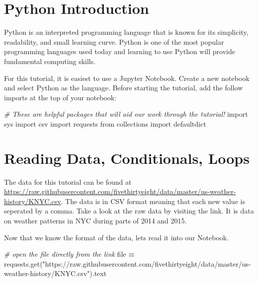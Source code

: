 \documentclass[]{book}
\newenvironment{Shaded}{\begin{snugshade}}{\end{snugshade}}
\newcommand{\StringTok}[1]{\textcolor[rgb]{0.31,0.60,0.02}{#1}}
\newcommand{\ImportTok}[1]{#1}
\newcommand{\CommentTok}[1]{\textcolor[rgb]{0.56,0.35,0.01}{\textit{#1}}}
\newcommand{\OperatorTok}[1]{\textcolor[rgb]{0.81,0.36,0.00}{\textbf{#1}}}
\newcommand{\BuiltInTok}[1]{#1}
\newcommand{\NormalTok}[1]{#1}
\begin{document}
\section{Python Introduction}\label{python-introduction}

Python is an interpreted programming language that is known for its
simplicity, readability, and small learning curve. Python is one of the
most popular programming languages used today and learning to use Python
will provide fundamental computing skills.

For this tutorial, it is easiest to use a Jupyter Notebook. Create a new
notebook and select Python as the language. Before starting the
tutorial, add the follow imports at the top of your notebook:

\begin{Shaded}
\begin{Highlighting}[]
\CommentTok{# These are helpful packages that will aid our work through the tutorial!}
\ImportTok{import}\NormalTok{ sys}
\ImportTok{import}\NormalTok{ csv}
\ImportTok{import}\NormalTok{ requests}
\ImportTok{from}\NormalTok{ collections }\ImportTok{import}\NormalTok{ defaultdict}
\end{Highlighting}
\end{Shaded}

\section{Reading Data, Conditionals,
Loops}\label{reading-data-conditionals-loops}

The data for this tutorial can be found at
\url{https://raw.githubusercontent.com/fivethirtyeight/data/master/us-weather-history/KNYC.csv}.
The data is in CSV format meaning that each new value is seperated by a
comma. Take a look at the raw data by visiting the link. It is data on
weather patterns in NYC during parts of 2014 and 2015.

Now that we know the format of the data, lets read it into our Notebook.

\begin{Shaded}
\begin{Highlighting}[]
\CommentTok{# open the file directly from the link}
\BuiltInTok{file} \OperatorTok{=}\NormalTok{ requests.get(}\StringTok{"https://raw.githubusercontent.com/fivethirtyeight/data/master/us-weather-history/KNYC.csv"}\NormalTok{).text}
\end{Highlighting}
\end{Shaded}
\end{document}
